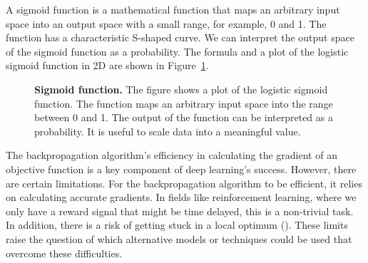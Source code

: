 A sigmoid function is a mathematical function that maps an arbitrary input space into an output space with a small range, for example, 0 and 1. The function has a characteristic S-shaped curve. We can interpret the output space of the sigmoid function as a probability. The formula and a plot of the logistic sigmoid function in 2D are shown in Figure~\ref{fig:sigmoid}.
\begin{figure}[ht]
\centering
{}
\caption[Sigmoid function]{
  \textbf{Sigmoid function.}
  The figure shows a plot of the logistic sigmoid function. The function maps an arbitrary input space into the range between 0 and 1. The output of the function can be interpreted as a probability. It is useful to scale data into a meaningful value.
}
\label{fig:sigmoid}
\end{figure}

The backpropagation algorithm's efficiency in calculating the gradient of an objective function is a key component of deep learning's success. However, there are certain limitations. For the backpropagation algorithm to be efficient, it relies on calculating accurate gradients. In fields like reinforcement learning, where we only have a reward signal that might be time delayed, this is a non-trivial task. In addition, there is a risk of getting stuck in a local optimum (\cite{ha2017visual}). These limits raise the question of which alternative models or techniques could be used that overcome these difficulties.



